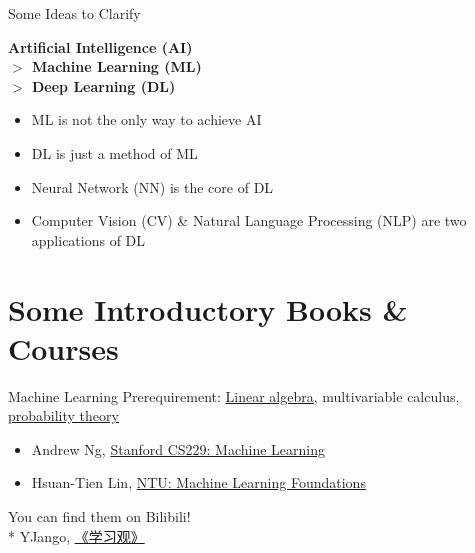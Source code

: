 \documentclass{../TexTemplate/myslide}
\begin{document}
\begin{frame}{Some Ideas to Clarify}
\begin{center}
\textbf{Artificial Intelligence (AI)\\
\qquad $>$ Machine Learning (ML)\\
\qquad\qquad $>$ Deep Learning (DL)}
\end{center}
\begin{itemize}
	\item ML is not the only way to achieve AI
	\item DL is just a method of ML
	\item Neural Network (NN) is the core of DL
	\item Computer Vision (CV) \& Natural Language Processing (NLP) are two applications of DL
\end{itemize}
\end{frame}

\section{Some Introductory Books \& Courses}
\begin{frame}
\sectionpage
\end{frame}

\begin{frame}{Machine Learning}
Prerequirement: \href{http://cs229.stanford.edu/section/cs229-linalg.pdf}{Linear algebra}, multivariable calculus, \href{http://cs229.stanford.edu/section/cs229-prob.pdf}{probability theory}
\begin{itemize}
	\item Andrew Ng, \href{http://cs229.stanford.edu/}{Stanford CS229: Machine Learning}
	\item Hsuan-Tien Lin, \href{https://www.csie.ntu.edu.tw/~htlin/course/mlfound19fall/}{NTU: Machine Learning Foundations}
\end{itemize}
You can find them on Bilibili!\\\bigskip
* YJango, \href{https://space.bilibili.com/344849038/channel/detail?cid=54015}{《学习观》}
\end{frame}
\end{document}
